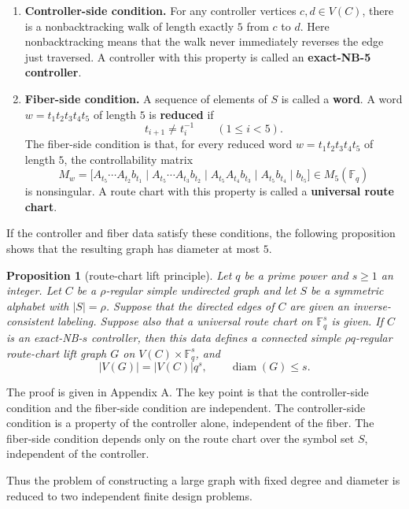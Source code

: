 \documentclass[11pt]{article}
\newtheorem{proposition}[theorem]{Proposition}
\theoremstyle{definition}
\theoremstyle{remark}
\renewcommand{\_}{\textunderscore\allowbreak}
\begin{document}
\begin{enumerate}
\def\labelenumi{\arabic{enumi}.}
\item
  \textbf{Controller-side condition.} For any controller vertices
  \(c,d\in V(C)\), there is a nonbacktracking walk of length exactly
  \(5\) from \(c\) to \(d\). Here nonbacktracking means that the walk
  never immediately reverses the edge just traversed. A controller with
  this property is called an \textbf{exact-NB-5 controller}.
\item
  \textbf{Fiber-side condition.} A sequence of elements of \(S\) is
  called a \textbf{word}. A word \(w=t_1t_2t_3t_4t_5\) of length \(5\)
  is \textbf{reduced} if \[
    t_{i+1}\ne t_i^{-1}\qquad(1\le i<5).
  \] The fiber-side condition is that, for every reduced word
  \(w=t_1t_2t_3t_4t_5\) of length \(5\), the controllability matrix \[
    M_w=
    \bigl[
    A_{t_5}\cdots A_{t_2}b_{t_1}\mid
    A_{t_5}\cdots A_{t_3}b_{t_2}\mid
    A_{t_5}A_{t_4}b_{t_3}\mid
    A_{t_5}b_{t_4}\mid
    b_{t_5}
    \bigr]
    \in M_5(\mathbb F_q)
  \] is nonsingular. A route chart with
  this property is called a \textbf{universal route chart}.
\end{enumerate}

If the controller and fiber data satisfy these conditions, the following
proposition shows that the resulting graph has diameter at most \(5\).

\begin{proposition}[route-chart lift principle]\label{prop:lift}
Let \(q\) be a prime
power and \(s\ge1\) an integer. Let \(C\) be a
\(\rho\)-regular simple undirected graph and let \(S\) be a symmetric
alphabet with \(|S|=\rho\). Suppose that the directed edges of \(C\) are
given an inverse-consistent labeling. Suppose also that a universal
route chart on \(\mathbb F_q^s\) is given. If \(C\) is an exact-NB-\(s\) controller, then this data defines
a connected simple \(\rho q\)-regular route-chart lift graph \(G\) on \(V(C)\times\mathbb F_q^s\),
and \[
  |V(G)|=|V(C)|q^s,
  \qquad
  \operatorname{diam}(G)\le s .
\]
\end{proposition}

The proof is given in Appendix A. The key point is that the
controller-side condition and the fiber-side condition are independent.
The controller-side condition is a property of the controller alone,
independent of the fiber. The fiber-side condition depends only on the
route chart over the symbol set \(S\), independent of the controller.

Thus the problem of constructing a large graph with fixed degree and
diameter is reduced to two independent finite design problems.
\end{document}
